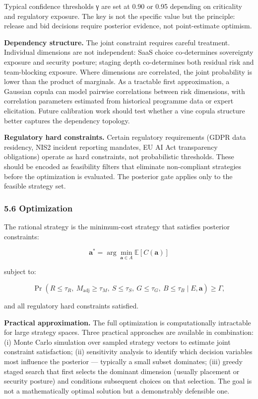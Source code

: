 \documentclass[
]{article}
\begin{document}
Typical confidence thresholds γ are set at 0.90 or 0.95 depending on
criticality and regulatory exposure. The key is not the specific value
but the principle: release and bid decisions require posterior evidence,
not point-estimate optimism.

\textbf{Dependency structure.} The joint constraint requires careful
treatment. Individual dimensions are not independent: SaaS choice
co-determines sovereignty exposure and security posture; staging depth
co-determines both residual risk and team-blocking exposure. Where
dimensions are correlated, the joint probability is lower than the
product of marginals. As a tractable first approximation, a Gaussian
copula can model pairwise correlations between risk dimensions, with
correlation parameters estimated from historical programme data or
expert elicitation. Future calibration work should test whether a vine
copula structure better captures the dependency topology.

\textbf{Regulatory hard constraints.} Certain regulatory requirements
(GDPR data residency, NIS2 incident reporting mandates, EU AI Act
transparency obligations) operate as hard constraints, not probabilistic
thresholds. These should be encoded as feasibility filters that
eliminate non-compliant strategies before the optimization is evaluated.
The posterior gate applies only to the feasible strategy set.

\subsubsection{5.6 Optimization}\label{optimization}

The rational strategy is the minimum-cost strategy that satisfies
posterior constraints:

\[\mathbf{a}^{*} = \arg\min_{\mathbf{a} \in A} \mathbb{E}[C(\mathbf{a})]\]

subject to:

\[\Pr(R \le \tau_R,\ M_{\mathrm{adj}} \ge \tau_M,\ S \le \tau_S,\ G \le \tau_G,\ B \le \tau_B \mid E, \mathbf{a}) \ge \Gamma,\]

and all regulatory hard constraints satisfied.

\textbf{Practical approximation.} The full optimization is
computationally intractable for large strategy spaces. Three practical
approaches are available in combination: (i) Monte Carlo simulation over
sampled strategy vectors to estimate joint constraint satisfaction; (ii)
sensitivity analysis to identify which decision variables most influence
the posterior --- typically a small subset dominates; (iii) greedy
staged search that first selects the dominant dimension (usually
placement or security posture) and conditions subsequent choices on that
selection. The goal is not a mathematically optimal solution but a
demonstrably defensible one.
\end{document}
